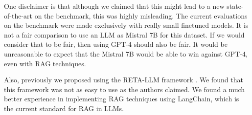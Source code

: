 \documentclass[11pt]{article}
\begin{document}
One disclaimer is that although we claimed that this might lead to a new state-of-the-art on the benchmark, this was highly misleading. The current evaluations on the benchmark were made exclusively with really small finetuned models. It is not a fair comparison to use an LLM as Mistral 7B for this dataset. If we would consider that to be fair, then using GPT-4 should also be fair. It would be unreasonable to expect that the Mistral 7B would be able to win against GPT-4, even with RAG techniques.

Also, previously we proposed using the RETA-LLM framework \cite{liu2023reta}. We found that this framework was not as easy to use as the authors claimed. We found a much better experience in implementing RAG techniques using LangChain, which is the current standard for RAG in LLMs.





\appendix
\end{document}
